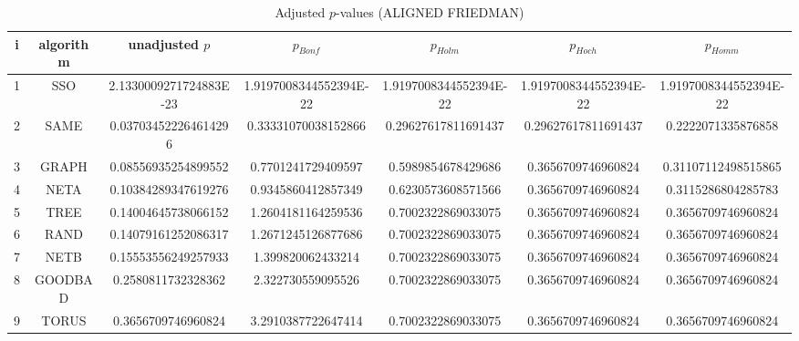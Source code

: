 \documentclass[a4paper,10pt]{article}
\begin{document}
\begin{landscape}
\begin{table}[!htp]
\centering\scriptsize
\caption{Adjusted $p$-values (ALIGNED FRIEDMAN)}
\begin{tabular}{ccccccc}
i&algorithm&unadjusted $p$&$p_{Bonf}$&$p_{Holm}$&$p_{Hoch}$&$p_{Homm}$\\
\hline
1& SSO&2.1330009271724883E-23&1.9197008344552394E-22&1.9197008344552394E-22&1.9197008344552394E-22&1.9197008344552394E-22\\
2& SAME&0.037034522264614296&0.33331070038152866&0.29627617811691437&0.29627617811691437&0.2222071335876858\\
3& GRAPH&0.08556935254899552&0.7701241729409597&0.5989854678429686&0.3656709746960824&0.31107112498515865\\
4& NETA&0.10384289347619276&0.9345860412857349&0.6230573608571566&0.3656709746960824&0.3115286804285783\\
5& TREE&0.14004645738066152&1.2604181164259536&0.7002322869033075&0.3656709746960824&0.3656709746960824\\
6& RAND&0.14079161252086317&1.2671245126877686&0.7002322869033075&0.3656709746960824&0.3656709746960824\\
7& NETB&0.15553556249257933&1.399820062433214&0.7002322869033075&0.3656709746960824&0.3656709746960824\\
8& GOODBAD&0.2580811732328362&2.322730559095526&0.7002322869033075&0.3656709746960824&0.3656709746960824\\
9& TORUS&0.3656709746960824&3.2910387722647414&0.7002322869033075&0.3656709746960824&0.3656709746960824\\
\hline
\end{tabular}
\end{table}


\end{landscape}
\end{document}
